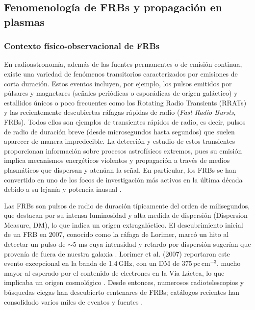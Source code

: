 
\subsection{Fenomenología de FRBs y propagación en plasmas}

\subsubsection{Contexto físico-observacional de FRBs}

En radioastronomía, además de las fuentes permanentes o de 
emisión continua, existe una variedad de fenómenos transitorios 
caracterizados por emisiones de corta duración. Estos eventos incluyen, 
por ejemplo, los pulsos emitidos por púlsares y magnetares (señales periódicas o esporádicas de
origen galáctico) y estallidos únicos o poco frecuentes como los Rotating Radio Transients 
(RRATs) y las recientemente descubiertas ráfagas rápidas de radio (\textit{Fast Radio Bursts}, FRBs). 
Todos ellos son ejemplos de transientes rápidos de radio, es decir, pulsos de radio de duración breve 
(desde microsegundos hasta segundos) que suelen aparecer de manera impredecible. La detección y estudio
de estos transientes proporcionan información sobre procesos astrofísicos extremos, pues su emisión 
implica mecanismos energéticos violentos y propagación a través de medios plasmáticos que dispersan 
y atenúan la señal. En particular, los FRBs se han convertido en uno de los focos de investigación 
más activos en la última década debido a su lejanía y potencia inusual \citep{Petroff_2022}.

Las FRBs son pulsos de radio de duración típicamente del orden de milisegundos, 
que destacan por su intensa luminosidad y alta medida de dispersión (Dispersion Measure, DM), lo que 
indica un origen extragaláctico. El descubrimiento inicial de un FRB en 2007, conocido como la ráfaga 
de Lorimer, marcó un hito al detectar un pulso de $\sim$5 ms cuya intensidad y retardo por dispersión 
sugerían que provenía de fuera de nuestra galaxia \citep{Lorimer2007}. Lorimer et al. (2007) reportaron 
este evento excepcional en la banda de 1.4\,GHz, con un DM de 375\,pc\,cm$^{-3}$, mucho mayor al esperado
 por el contenido de electrones en la Vía Láctea, lo que implicaba un origen cosmológico 
 \citep{Lorimer2007,CordesMcLaughlin2003}. Desde entonces, numerosos radiotelescopios y 
 búsquedas ciegas han descubierto centenares de FRBs; catálogos recientes han consolidado 
 varios miles de eventos y fuentes \citep{CHIME2021,CHIMEFRB_2021_Catalog1,Petroff2019}.

